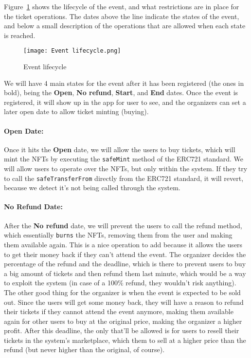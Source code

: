 Figure~\ref{fig:event_lifecycle} shows the lifecycle of the event, and what
restrictions are in place for the ticket operations. The dates above the line
indicate the states of the event, and below a small description of the
operations that are allowed when each state is reached.

\begin{figure}[H]
	\texttt{[image: Event lifecycle.png]}
	\centering
	\caption{Event lifecycle}\label{fig:event_lifecycle}
\end{figure}

We will have 4 main states for the event after it has been registered (the ones
in bold), being the \textbf{Open}, \textbf{No refund}, \textbf{Start}, and
\textbf{End} dates. Once the event is registered, it will show up in the app
for user to see, and the organizers can set a later open date to allow ticket
minting (buying).

\paragraph{Open Date:} Once it hits the \textbf{Open} date, we will allow the users to buy tickets,
which will mint the NFTs by executing the \texttt{safeMint} method of the
ERC721 standard. We will allow users to operate over the NFTs, but only within
the system. If they try to call the \texttt{safeTransferFrom} directly from the
ERC721 standard, it will revert, because we detect it's not being called
through the system.

\paragraph{No Refund Date:} After the \textbf{No refund} date, we will prevent the users to call the refund
method, which essentially \texttt{burns} the NFTs, removing them from the user
and making them available again. This is a nice operation to add because it
allows the users to get their money back if they can't attend the event. The
organizer decides the percentage of the refund and the deadline, which is there
to prevent users to buy a big amount of tickets and then refund them last
minute, which would be a way to exploit the system (in case of a 100\% refund,
they wouldn't risk anything). The other good thing for the organizer is when
the event is expected to be sold out. Since the users will get some money back,
they will have a reason to refund their tickets if they cannot attend the event
anymore, making them available again for other users to buy at the original
price, making the organizer a higher profit. After this deadline, the only
that'll be allowed is for users to resell their tickets in the system's
marketplace, which them to sell at a higher price than the refund (but never
higher than the original, of course).

